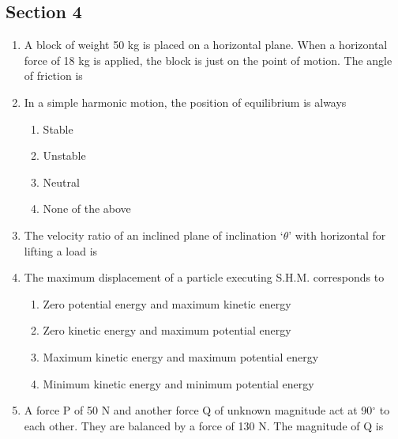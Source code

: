 \documentclass[11pt,a4paper]{article}
\begin{document}
\subsection*{Section 4}
\begin{enumerate}
\item{A block of weight 50 kg is placed on a horizontal plane. When a horizontal force of 18 kg is applied, the block is just on the point of motion. The angle of friction is}
\\
\item{In a simple harmonic motion, the position of equilibrium is always}
\begin{enumerate}[label=\Alph*.]
\item{Stable}
\item{Unstable}
\item{Neutral}
\item{None of the above}
\end{enumerate}
\item{The velocity ratio of an inclined plane of inclination `$\theta$' with horizontal for lifting a load is
}
\\
\item{The maximum displacement of a particle executing S.H.M. corresponds to}
\begin{enumerate}[label=\Alph*.]
\item{Zero potential energy and maximum kinetic energy}
\item{Zero kinetic energy and maximum potential energy}
\item{Maximum kinetic energy and maximum potential energy}
\item{Minimum kinetic energy and minimum potential energy}
\end{enumerate}
\item{A force P of 50 N and another force Q of unknown magnitude act at 90$^\circ$ to each other. They are balanced by a force of 130 N. The magnitude of Q is
}
\end{enumerate}
\end{document}
